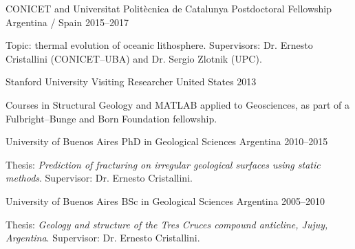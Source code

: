 
\begin{cventries}

\cventry
    {CONICET and Universitat Politècnica de Catalunya}
    {Postdoctoral Fellowship}
    {Argentina / Spain}
    {2015--2017}
    {
      \begin{cvitems}
        \item {Topic: thermal evolution of oceanic lithosphere. Supervisors: Dr. Ernesto Cristallini (CONICET--UBA) and Dr. Sergio Zlotnik (UPC).}
      \end{cvitems}
    }

\cventry
    {Stanford University}
    {Visiting Researcher}
    {United States}
    {2013}
    {
      \begin{cvitems}
        \item {Courses in Structural Geology and MATLAB applied to Geosciences, as part of a Fulbright--Bunge and Born Foundation fellowship.}
      \end{cvitems}
    }

\cventry
    {University of Buenos Aires}
    {PhD in Geological Sciences}
    {Argentina}
    {2010--2015}
    {
      \begin{cvitems}
        \item {Thesis: \emph{Prediction of fracturing on irregular geological surfaces using static methods}. Supervisor: Dr. Ernesto Cristallini.}
      \end{cvitems}
    }

\cventry
    {University of Buenos Aires}
    {BSc in Geological Sciences}
    {Argentina}
    {2005--2010}
    {
      \begin{cvitems}
        \item {Thesis: \emph{Geology and structure of the Tres Cruces compound anticline, Jujuy, Argentina}. Supervisor: Dr. Ernesto Cristallini.}
      \end{cvitems}
    }

\end{cventries}
